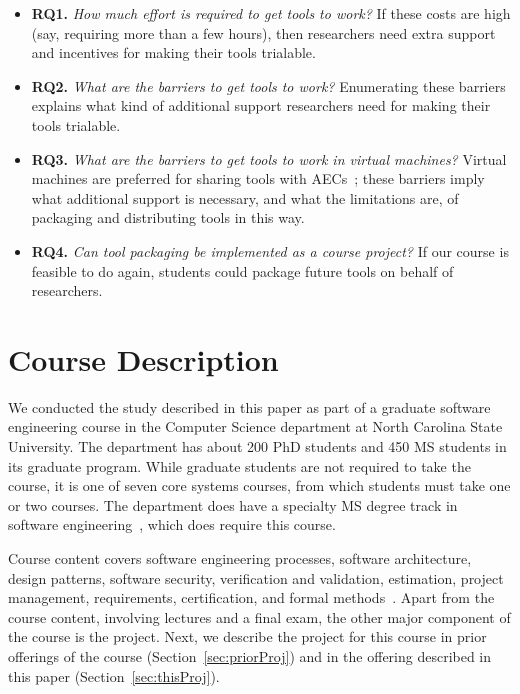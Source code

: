 \documentclass[10pt,conference]{IEEEtran}
\begin{document}
\begin{itemize}
  
\item\textbf{RQ1.} \textit{How much effort is required to get tools to work?}
If these costs are high (say, requiring more than a few hours), 
then researchers need extra support and incentives for 
making their tools trialable.

\item\textbf{RQ2.} \textit{What are the barriers to get tools to work?}
Enumerating these barriers explains what kind of additional
support researchers need for making their tools trialable.

\item\textbf{RQ3.} \textit{What are the barriers to get tools to work in virtual machines?}
Virtual machines are preferred for sharing tools with AECs~\cite{guidelines}; 
these barriers imply what additional support is
necessary, and what the limitations are, of packaging and 
distributing tools in this way.

\item\textbf{RQ4.} \textit{Can tool packaging be implemented as a course project?}
If our course is feasible to do again, 
students could package future tools on behalf of researchers.
\end{itemize}

\section{Course Description}

We conducted the study described in this paper as 
part of a graduate software engineering course
in the Computer Science department at 
North Carolina State University.
The department has about 200 PhD students and 450
MS students in its graduate program.
While graduate students are not required to
take the course, it is one of seven core systems
courses, from which students must take one or two courses.
The department does have a specialty MS degree
track in software 
engineering~\cite{mstrack},
which does require this course.

Course content covers software engineering processes,
software architecture, design patterns, software security,
verification and validation, estimation, project management,
requirements, certification, and formal 
methods~\cite{syllabus}.
Apart from the course content, involving lectures and
a final exam, the other
major component of the course is the project.
Next, we describe the project for this course 
in prior offerings of the course (Section~\ref{sec:priorProj})
and in the offering described in this paper (Section~\ref{sec:thisProj}).
\end{document}
